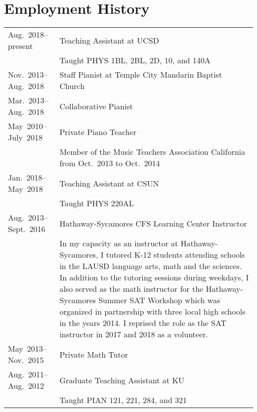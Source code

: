 \documentclass{cv}
\begin{document}
\section*{Employment History}
\begin{adjustwidth}{0.5in}{}
  \vspace{-1em}
  \begin{tabularx}{\textwidth}{@{\hspace*{\leftmargin}}lX}
    Aug.~2018--present & Teaching Assistant at UCSD\\
    & Taught PHYS 1BL, 2BL, 2D, 10, and 140A\\

    Nov.~2013--Aug.~2018 & Staff Pianist at Temple City Mandarin Baptist Church\\

    Mar.~2013--Aug.~2018 & Collaborative Pianist\\

    May~2010--July~2018 & Private Piano Teacher\\
    & Member of the Music Teachers Association
    California from Oct.\ 2013 to Oct.\ 2014\\

    Jan.~2018--May~2018 & Teaching Assistant at CSUN\\
    & Taught PHYS 220AL\\

    Aug.~2013--Sept.~2016 & Hathaway-Sycamores CFS Learning Center Instructor\\
    & In my capacity as an instructor at Hathaway-Sycamores, I tutored K-12
    students attending schools in the LAUSD language arts, math and the
    sciences. In addition to the tutoring sessions during weekdays, I also
    served as the math instructor for the Hathaway-Sycamores Summer SAT Workshop
    which was organized in partnership with three local high schools in the
    years 2014\textendash2016. I reprised the role as the SAT instructor in 2017
    and 2018 as a volunteer. \\

    May~2013--Nov.~2015 & Private Math Tutor\\

    Aug.~2011--Aug.~2012 & Graduate Teaching Assistant at KU\\
    & Taught PIAN 121, 221, 284, and 321\\
  \end{tabularx}
  \vspace{-2.5em}
\end{adjustwidth}
\end{document}
